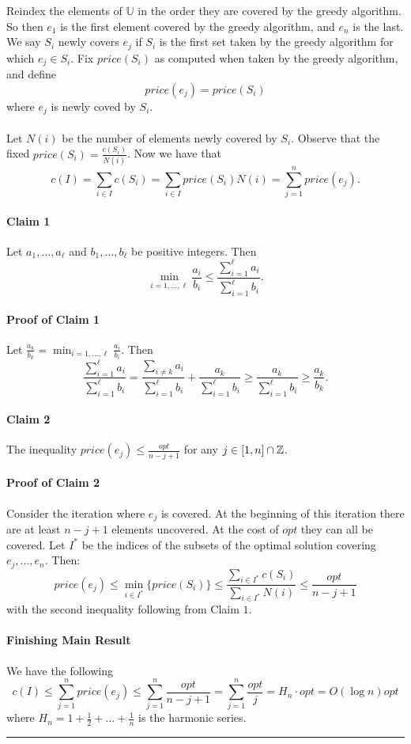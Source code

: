\documentclass[letterpaper,12pt,oneside,onecolumn]{article}
\newcommand{\U}{\mathbb{U}}
\newenvironment{proof}{{\bf Proof:  }}{\hfill\rule{2mm}{2mm}}
\begin{document}
\begin{proof}
Reindex the elements of $\U$ in the order they are covered by the greedy algorithm. So then $e_1$ is the first element covered by the greedy algorithm, and $e_n$ is the last. We say $S_i$ newly covers $e_j$ if $S_i$ is the first set taken by the greedy algorithm for which $e_j \in S_i$. Fix $price(S_i)$ as computed when taken by the greedy algorithm, and define
$$price(e_j) = price(S_i)$$
where $e_j$ is newly coved by $S_i$.
\paragraph{}
Let $N(i)$ be the number of elements newly covered by $S_i$. Observe that the fixed $price(S_i) = \frac{c(S_i)}{N(i)}$. Now we have that
$$c(I) = \sum_{i \in I} c(S_i) = \sum_{i \in I} price(S_i)N(i) = \sum_{j=1}^n price(e_j).$$
\paragraph{Claim 1}
Let $a_1, \dots, a_\ell$ and $b_1, \dots, b_\ell$ be positive integers. Then $$\min_{i = 1,\dots,\ell} \frac{a_i}{b_i} \leq \frac{\sum_{i=1}^\ell a_i}{\sum_{i=1}^\ell b_i}.$$
\paragraph{Proof of Claim 1}
Let $\frac{a_k}{b_k} = \min_{i = 1,\dots,\ell} \frac{a_i}{b_i}$. Then
$$ \frac{\sum_{i=1}^\ell a_i}{\sum_{i=1}^\ell b_i} = \frac{\sum_{i\neq k} a_i}{\sum_{i=1}^\ell b_i} + \frac{a_k}{\sum_{i=1}^\ell b_i} \geq \frac{a_k}{\sum_{i=1}^\ell b_i} \geq \frac{a_k}{b_k}.$$
\paragraph{Claim 2}
The inequality $price(e_j) \leq \frac{opt}{n-j+1}$ for any $j \in [1,n]\cap \mathbb{Z}$.
\paragraph{Proof of Claim 2}
Consider the iteration where $e_j$ is covered. At the beginning of this iteration there are at least $n-j+1$ elements uncovered. At the cost of $opt$ they can all be covered. Let $I^*$ be the indices of the subsets of the optimal solution covering $e_j, \dots, e_n$. Then:
$$price(e_j) \leq \min_{i \in I^*} \{ price(S_i)\} \leq \frac{ \sum_{i \in I^*} c(S_i)}{\sum_{i \in I^*} N(i)} \leq \frac{opt}{n-j+1}$$
with the second inequality following from Claim $1$.
\paragraph{Finishing Main Result}
We have the following
$$c(I) \leq \sum_{j=1}^n price(e_j) \leq \sum_{j=1}^n \frac{opt}{n-j+1} = \sum_{j=1}^n \frac{opt}{j} = H_n \cdot opt = O(\log n) opt$$
where $H_n = 1 + \frac{1}{2} + \dots + \frac{1}{n}$ is the harmonic series.
\end{proof}
\end{document}
